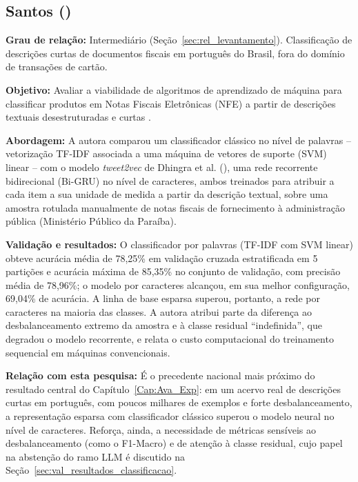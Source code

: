 \subsection{Santos (\citeyear{santos2023classificacao})}
\textbf{Grau de relação:} Intermediário (Seção~\ref{sec:rel_levantamento}). Classificação de descrições curtas de documentos fiscais em português do Brasil, fora do domínio de transações de cartão.

\textbf{Objetivo:} Avaliar a viabilidade de algoritmos de aprendizado de máquina para classificar produtos em Notas Fiscais Eletrônicas (NFE) a partir de descrições textuais desestruturadas e curtas \cite{santos2023classificacao}.

\textbf{Abordagem:} A autora comparou um classificador clássico no nível de palavras -- vetorização TF-IDF associada a uma máquina de vetores de suporte (SVM) linear -- com o modelo \textit{tweet2vec} de Dhingra et al. (\citeyear{dhingra2016tweet2vec}), uma rede recorrente bidirecional (Bi-GRU) no nível de caracteres, ambos treinados para atribuir a cada item a sua unidade de medida a partir da descrição textual, sobre uma amostra rotulada manualmente de notas fiscais de fornecimento à administração pública (Ministério Público da Paraíba).

\textbf{Validação e resultados:} O classificador por palavras (TF-IDF com SVM linear) obteve acurácia média de 78,25\% em validação cruzada estratificada em 5 partições e acurácia máxima de 85,35\% no conjunto de validação, com precisão média de 78,96\%; o modelo por caracteres alcançou, em sua melhor configuração, 69,04\% de acurácia. A linha de base esparsa superou, portanto, a rede por caracteres na maioria das classes. A autora atribui parte da diferença ao desbalanceamento extremo da amostra e à classe residual ``indefinida'', que degradou o modelo recorrente, e relata o custo computacional do treinamento sequencial em máquinas convencionais.

\textbf{Relação com esta pesquisa:} É o precedente nacional mais próximo do resultado central do Capítulo~\ref{Cap:Ava_Exp}: em um acervo real de descrições curtas em português, com poucos milhares de exemplos e forte desbalanceamento, a representação esparsa com classificador clássico superou o modelo neural no nível de caracteres. Reforça, ainda, a necessidade de métricas sensíveis ao desbalanceamento (como o F1-Macro) e de atenção à classe residual, cujo papel na abstenção do ramo LLM é discutido na Seção~\ref{sec:val_resultados_classificacao}.

